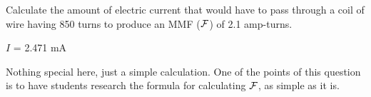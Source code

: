 

Calculate the amount of electric current that would have to pass through a coil of wire having 850 turns to produce an MMF ($\cal F$) of 2.1 amp-turns.







$I$ = 2.471 mA







Nothing special here, just a simple calculation.  One of the points of this question is to have students research the formula for calculating $\cal F$, as simple as it is.




